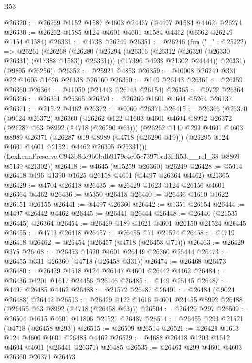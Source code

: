 \begin{lexlean}{R53}
\begin{coremodule}
@26320 := @26269 @1152 @1587 @4603 @24437 (@4497 @1584 @4462) @26274
@26330 := @26262 @1585 @124 @4601 @4601 @1584 @4462 (@6662 @26249 @1154 @1584)
@26331 := @4738 @26249
@26351 := @26246
    (fun ("_" : @25922) =>
    @26261
      (@26268
        (@26280
          (@26294 (@26306 (@26312 (@26320 (@26330 @26331) (@17388 @1583)) @26331)))
          (@17396 @4938 @21302 @24444))
        @26331)
      (@9895 @26256))
@26352 := @25921 @4853
@26359 := @10008 @26249 @331 @22 @1605 @1626 @26138 @26160
@26360 := @149 @26143
@26361 := @26359 @26360
@26364 := @11059 (@21443 @26143 @26154)
@26365 := @9722 @26364
@26366 := @26361 @26365
@26370 := @26269 @1601 @1604 @5264 @26137
@26371 := @21572 @4462
@26372 := @9060 @26371
@26415 := @26366
    (@26370
      (@9024 @26372)
      @26360
      (@26262
        @122
        @1603
        @4601
        @4604
        @8992
        @26372
        (@26287 @63 @8992 (@4718 (@26290 @63)))
        (@26262
          @140
          @299
          @4601
          @4603
          @8989
          @26371
          (@26287 @19 @8989 (@4718 (@26290 @19)))
          (@26295 @124 @4601 @4601 @21521 @4462 @26305 @26331)))
      (LexLeanPreserve.C943b8de9b0bdb9179c4e05c7397bed3f.R53.__rel_38 @8869 @5139 @21302))
@26418 := @4645 (@15259 @26360) @26249
@26428 := @5014 @26418 @196 @1390 @1625 @26158 @4601 (@4497 @26364 @4462) @26365
@26429 := @4704 @26418
@26435 := @26429 @1623 @124 @26156 @4601 @26364 @4462
@26436 := @5350 @26418
@26440 := @26436 @1610 @1622 @26151 @26155
@26441 := @4497 @26360
@26442 := @1351 @26154
@26444 := @4497 @26442 @4462
@26445 := @26441 @26444
@26448 := @26440 (@21535 @26445) @26364
@26454 := @26429 @189 @1621 @4601 @26150 @21524 @26445
@26455 := @4713 @26418
@26457 := @26455 @71 @21524
@26458 := @4719 @26418
@26462 := @26454 (@26457 (@4718 (@26458 @71)))
@26463 := @26429 @375
@26468 := @26463 @1620 @4601 @26149 @26360 @26444
@26473 := @26455 @331 @26360 (@4718 (@26458 @331))
@26474 := @26468 @26473
@26480 := @26429 @1618 @124 @26147 @4601 @26442 @4462
@26484 := @26436 @1201 @1617 @24456 @26146
@26485 := @149 @26145
@26487 := @4497 @26485 @4462
@26488 := @21572 @26487
@26491 := @26484 (@9024 @26488) @26442
@26503 := @26429 @122 @1616 @4601 @24455 @8992 @26488 (@26455 @63 @8992 (@4718 (@26458 @63)))
@26504 := @26429 @297
@26509 := @26504 @1615 @4601 @11806 @21521 @26487
@26514 := @26455 @293 @21521 (@4718 (@26458 @293))
@26515 := @26509 @26514
@26521 := @26429 @1613 @124 @4606 @4601 @26485 @4462
@26529 := @4688 @26418 @1203 @1612 @4604 @4601 (@26441 @26371) @26485
@26535 := @26463 @299 @4601 @4603 @26360 @26371 @26473

\end{coremodule}
\end{lexlean}
